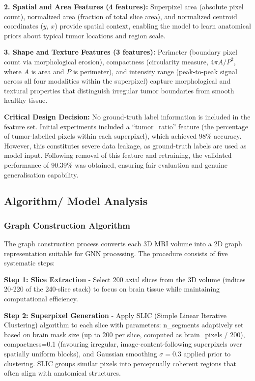 \textbf{2. Spatial and Area Features (4 features):} Superpixel area (absolute pixel count), normalized area (fraction of total slice area), and normalized centroid coordinates ($y$, $x$) provide spatial context, enabling the model to learn anatomical priors about typical tumor locations and region scale.

\textbf{3. Shape and Texture Features (3 features):} Perimeter (boundary pixel count via morphological erosion), compactness (circularity measure, $4\pi A / P^2$, where $A$ is area and $P$ is perimeter), and intensity range (peak-to-peak signal across all four modalities within the superpixel) capture morphological and textural properties that distinguish irregular tumor boundaries from smooth healthy tissue.

\textbf{Critical Design Decision:} No ground-truth label information is included in the feature set. Initial experiments included a ``tumor\_ratio'' feature (the percentage of tumor-labelled pixels within each superpixel), which achieved 98\% accuracy. However, this constitutes severe data leakage, as ground-truth labels are used as model input. Following removal of this feature and retraining, the validated performance of 90.39\% was obtained, ensuring fair evaluation and genuine generalisation capability.


\subsection{Algorithm/ Model Analysis}

\subsubsection{Graph Construction Algorithm}

The graph construction process converts each 3D MRI volume into a 2D graph representation suitable for GNN processing. The procedure consists of five systematic steps:

\textbf{Step 1: Slice Extraction} - Select 200 axial slices from the 3D volume (indices 20-220 of the 240-slice stack) to focus on brain tissue while maintaining computational efficiency.

\textbf{Step 2: Superpixel Generation} - Apply SLIC (Simple Linear Iterative Clustering) algorithm to each slice with parameters: n\_segments adaptively set based on brain mask size (up to 200 per slice, computed as brain\_pixels / 200), compactness=0.1 (favouring irregular, image-content-following superpixels over spatially uniform blocks), and Gaussian smoothing $\sigma=0.3$ applied prior to clustering. SLIC groups similar pixels into perceptually coherent regions that often align with anatomical structures.

